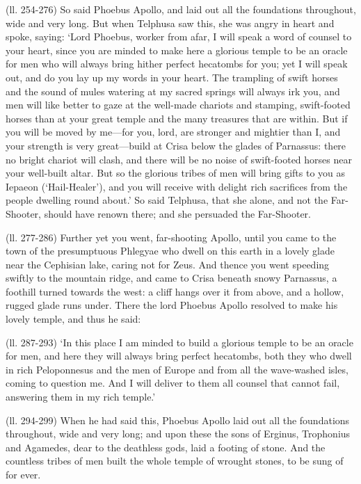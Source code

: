 (ll. 254-276) So said Phoebus Apollo, and laid out all the foundations
throughout, wide and very long. But when Telphusa saw this, she was angry in
heart and spoke, saying: ‘Lord Phoebus, worker from afar, I will speak a
word of counsel to your heart, since you are minded to make here a glorious
temple to be an oracle for men who will always bring hither perfect hecatombs
for you; yet I will speak out, and do you lay up my words in your heart. The
trampling of swift horses and the sound of mules watering at my sacred springs
will always irk you, and men will like better to gaze at the well-made chariots
and stamping, swift-footed horses than at your great temple and the many
treasures that are within. But if you will be moved by me—for you, lord,
are stronger and mightier than I, and your strength is very great—build
at Crisa below the glades of Parnassus: there no bright chariot will clash, and
there will be no noise of swift-footed horses near your well-built altar. But
so the glorious tribes of men will bring gifts to you as Iepaeon
(‘Hail-Healer’), and you will receive with delight rich sacrifices
from the people dwelling round about.’ So said Telphusa, that she alone,
and not the Far-Shooter, should have renown there; and she persuaded the
Far-Shooter.

(ll. 277-286) Further yet you went, far-shooting Apollo, until you came to the
town of the presumptuous Phlegyae who dwell on this earth in a lovely glade
near the Cephisian lake, caring not for Zeus. And thence you went speeding
swiftly to the mountain ridge, and came to Crisa beneath snowy Parnassus, a
foothill turned towards the west: a cliff hangs over it from above, and a
hollow, rugged glade runs under. There the lord Phoebus Apollo resolved to make
his lovely temple, and thus he said:

(ll. 287-293) ‘In this place I am minded to build a glorious temple to be
an oracle for men, and here they will always bring perfect hecatombs, both they
who dwell in rich Peloponnesus and the men of Europe and from all the
wave-washed isles, coming to question me. And I will deliver to them all
counsel that cannot fail, answering them in my rich temple.’

(ll. 294-299) When he had said this, Phoebus Apollo laid out all the
foundations throughout, wide and very long; and upon these the sons of Erginus,
Trophonius and Agamedes, dear to the deathless gods, laid a footing of stone.
And the countless tribes of men built the whole temple of wrought stones, to be
sung of for ever.

